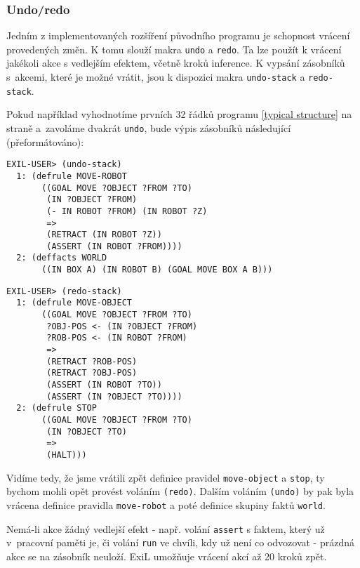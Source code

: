 \subsubsection{Undo/redo}
\label{undo}

Jedním z implementovaných rozšíření původního programu je schopnost vrácení
provedených změn. K tomu slouží makra \verb|undo| a \verb|redo|. Ta lze použít k
vrácení jakékoli akce s vedlejším efektem, včetně kroků inference. K vypsání
zásobníků s~akcemi, které je možné vrátit, jsou k dispozici makra
\verb|undo-stack| a \verb|redo-stack|.

Pokud například vyhodnotíme prvních 32 řádků programu \ref{typical structure} na
straně \pageref{typical structure} a~zavoláme dvakrát \verb|undo|, bude výpis
zásobníků následující (přeformátováno):
\begin{verbatim}
EXIL-USER> (undo-stack)
  1: (defrule MOVE-ROBOT
       ((GOAL MOVE ?OBJECT ?FROM ?TO)
        (IN ?OBJECT ?FROM)
        (- IN ROBOT ?FROM) (IN ROBOT ?Z)
        =>
        (RETRACT (IN ROBOT ?Z))
        (ASSERT (IN ROBOT ?FROM))))
  2: (deffacts WORLD
       ((IN BOX A) (IN ROBOT B) (GOAL MOVE BOX A B)))
\end{verbatim}
\begin{verbatim}
EXIL-USER> (redo-stack)
  1: (defrule MOVE-OBJECT
       ((GOAL MOVE ?OBJECT ?FROM ?TO)
        ?OBJ-POS <- (IN ?OBJECT ?FROM)
        ?ROB-POS <- (IN ROBOT ?FROM)
        =>
        (RETRACT ?ROB-POS)
        (RETRACT ?OBJ-POS)
        (ASSERT (IN ROBOT ?TO))
        (ASSERT (IN ?OBJECT ?TO))))
  2: (defrule STOP
       ((GOAL MOVE ?OBJECT ?FROM ?TO)
        (IN ?OBJECT ?TO)
        =>
        (HALT)))
\end{verbatim}
Vidíme tedy, že jsme vrátili zpět definice pravidel \verb|move-object| a
\verb|stop|, ty bychom mohli opět provést voláním \verb|(redo)|. Dalším voláním
\verb|(undo)| by pak byla vrácena definice pravidla \verb|move-robot| a poté
definice skupiny faktů \verb|world|.

Nemá-li akce žádný vedlejší efekt - např. volání \verb|assert| s faktem, který
už v~pracovní paměti je, či volání \verb|run| ve chvíli, kdy už není co
odvozovat - prázdná akce se na zásobník neuloží. ExiL umožňuje vrácení akcí až
20 kroků zpět.
